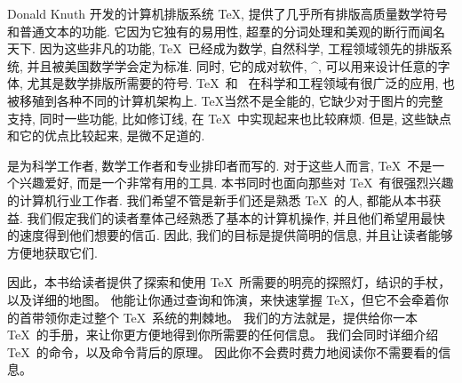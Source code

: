 


{\tighten
Donald Knuth 开发的计算机排版系统 \TeX,
提供了几乎所有排版高质量数学符号和普通文本的功能.
它因为它独有的易用性, 超羣的分词处理和美观的断行而闻名天下.
因为这些非凡的功能, \TeX\ 已经成为数学, 自然科学, 工程领域领先的排版系统,
并且被美国数学学会定为标准.
同时, 它的成对软件, ^{\Metafont}, 可以用来设计任意的字体, 尤其是数学排版所需要的符号.
\TeX\ 和 \Metafont\ 在科学和工程领域有很广泛的应用,
也被移殖到各种不同的计算机架构上.
\TeX 当然不是全能的, 它缺少对于图片的完整支持,
同时一些功能, 比如修订线, 在 \TeX\ 中实现起来也比较麻烦.
但是, 这些缺点和它的优点比较起来, 是微不足道的.
\par}

\thisbook\/ 是为科学工作者, 数学工作者和专业排印者而写的.
对于这些人而言, \TeX\ 不是一个兴趣爱好, 而是一个非常有用的工具.
本书同时也面向那些对 \TeX\ 有很强烈兴趣的计算机行业工作者.
我们希望不管是新手们还是熟悉 \TeX\ 的人, 都能从本书获益.
我们假定我们的读者羣体己经熟悉了基本的计算机操作,
并且他们希望用最快的速度得到他们想要的信屲.
因此, 我们的目标是提供简明的信息, 并且让读者能够方便地获取它们.


{\tighten
因此，本书给读者提供了探索和使用 \TeX\ 所需要的明亮的探照灯，结识的手杖，以及详细的地图。
他能让你通过查询和饰演，来快速掌握 \TeX，但它不会牵着你的首带领你走过整个 \TeX\ 系统的荆棘地。
我们的方法就是，提供给你一本 \TeX\ 的手册，来让你更方便地得到你所需要的任何信息。
我们会同时详细介绍 \TeX\ 的命令，以及命令背后的原理。
因此你不会费时费力地阅读你不需要看的信息。 \par}


